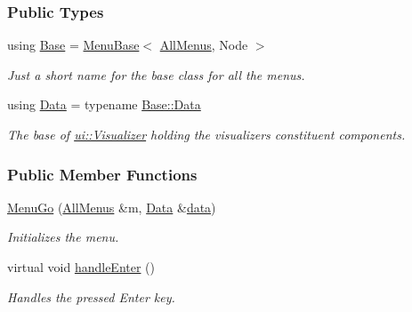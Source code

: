 \subsubsection*{Public Types}
\begin{DoxyCompactItemize}
\item 
using \hyperlink{structslb_1_1core_1_1ui_1_1MenuGo_addebcbcc35b2009b4ae099b1bfed8638}{Base} = \hyperlink{structslb_1_1core_1_1ui_1_1MenuBase}{Menu\+Base}$<$ \hyperlink{structslb_1_1core_1_1ui_1_1AllMenus}{All\+Menus}, Node $>$\hypertarget{structslb_1_1core_1_1ui_1_1MenuGo_addebcbcc35b2009b4ae099b1bfed8638}{}\label{structslb_1_1core_1_1ui_1_1MenuGo_addebcbcc35b2009b4ae099b1bfed8638}

\begin{DoxyCompactList}\small\item\em Just a short name for the base class for all the menus. \end{DoxyCompactList}\item 
using \hyperlink{structslb_1_1core_1_1ui_1_1MenuGo_a597faaab9baa7bb3e2001211ccc5d02f}{Data} = typename \hyperlink{structslb_1_1core_1_1ui_1_1MenuBase_a1803444111552d2e5b87671292dd74cb}{Base\+::\+Data}\hypertarget{structslb_1_1core_1_1ui_1_1MenuGo_a597faaab9baa7bb3e2001211ccc5d02f}{}\label{structslb_1_1core_1_1ui_1_1MenuGo_a597faaab9baa7bb3e2001211ccc5d02f}

\begin{DoxyCompactList}\small\item\em The base of \hyperlink{structslb_1_1core_1_1ui_1_1Visualizer}{ui\+::\+Visualizer} holding the visualizer\textquotesingle{}s constituent components. \end{DoxyCompactList}\end{DoxyCompactItemize}
\subsubsection*{Public Member Functions}
\begin{DoxyCompactItemize}
\item 
\hyperlink{structslb_1_1core_1_1ui_1_1MenuGo_adb41085df4cc30c8b275e8d87468d787}{Menu\+Go} (\hyperlink{structslb_1_1core_1_1ui_1_1AllMenus}{All\+Menus} \&m, \hyperlink{structslb_1_1core_1_1ui_1_1MenuBase_a1803444111552d2e5b87671292dd74cb}{Data} \&\hyperlink{structslb_1_1core_1_1ui_1_1MenuBase_a475d9457affb2b4fc96737e269d6911f}{data})
\begin{DoxyCompactList}\small\item\em Initializes the menu. \end{DoxyCompactList}\item 
virtual void \hyperlink{structslb_1_1core_1_1ui_1_1MenuGo_acdd7d92efea512c16e4862ea60c66e45}{handle\+Enter} ()\hypertarget{structslb_1_1core_1_1ui_1_1MenuGo_acdd7d92efea512c16e4862ea60c66e45}{}\label{structslb_1_1core_1_1ui_1_1MenuGo_acdd7d92efea512c16e4862ea60c66e45}

\begin{DoxyCompactList}\small\item\em Handles the pressed Enter key. \end{DoxyCompactList}\end{DoxyCompactItemize}
